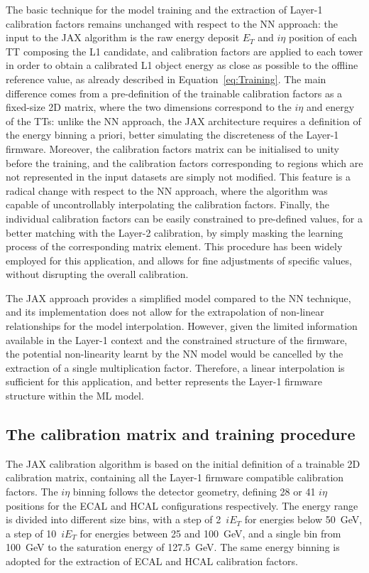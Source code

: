 The basic technique for the model training and the extraction of Layer-1 calibration factors remains unchanged with respect to the NN approach: the input to the JAX algorithm is the raw energy deposit $E_T$ and $i\eta$ position of each TT composing the L1 candidate, and calibration factors are applied to each tower in order to obtain a calibrated L1 object energy as close as possible to the offline reference value, as already described in Equation~\ref{eq:Training}. 
The main difference comes from a pre-definition of the trainable calibration factors as a fixed-size 2D matrix, where the two dimensions correspond to the $i\eta$ and energy of the TTs: unlike the NN approach, the JAX architecture requires a definition of the energy binning a priori, better simulating the discreteness of the Layer-1 firmware.
Moreover, the calibration factors matrix can be initialised to unity before the training, and the calibration factors corresponding to regions which are not represented in the input datasets are simply not modified. This feature is a radical change with respect to the NN approach, where the algorithm was capable of uncontrollably interpolating the calibration factors.
Finally, the individual calibration factors can be easily constrained to pre-defined values, for a better matching with the Layer-2 calibration, by simply masking the learning process of the corresponding matrix element. This procedure has been widely employed for this application, and allows for fine adjustments of specific values, without disrupting the overall calibration. 

The JAX approach provides a simplified model compared to the NN technique, and its implementation does not allow for the extrapolation of non-linear relationships for the model interpolation. However, given the limited information available in the Layer-1 context and the constrained structure of the firmware, the potential non-linearity learnt by the NN model would be cancelled by the extraction of a single multiplication factor. Therefore, a linear interpolation is sufficient for this application, and better represents the Layer-1 firmware structure within the ML model.

\subsection{The calibration matrix and training procedure}

The JAX calibration algorithm is based on the initial definition of a trainable 2D calibration matrix, containing all the Layer-1 firmware compatible calibration factors. The $i\eta$ binning follows the detector geometry, defining 28 or 41 $i\eta$ positions for the ECAL and HCAL configurations respectively. The energy range is divided into different size bins, with a step of 2~$iE_T$ for energies below 50~GeV, a step of 10~$iE_T$ for energies between 25 and 100~GeV, and a single bin from 100~GeV to the saturation energy of 127.5~GeV. The same energy binning is adopted for the extraction of ECAL and HCAL calibration factors.

